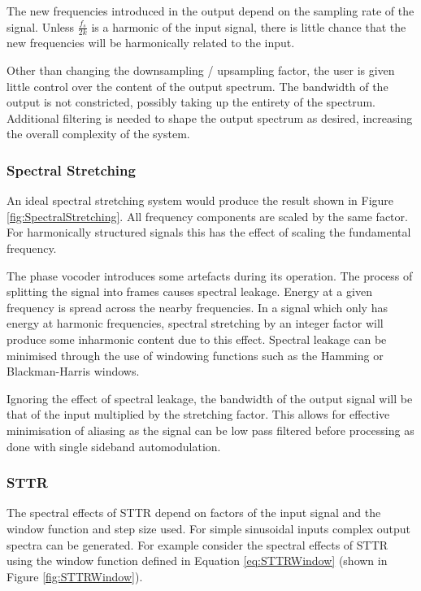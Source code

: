 			The new frequencies introduced in the output depend on the sampling rate of the signal. Unless
			$\frac{f_{s}}{2k}$ is a harmonic of the input signal, there is little chance that the new
			frequencies will be harmonically related to the input.

			Other than changing the downsampling / upsampling factor, the user is given little control over the
			content of the output spectrum. The bandwidth of the output is not constricted, possibly taking up
			the entirety of the spectrum. Additional filtering is needed to shape the output spectrum as
			desired, increasing the overall complexity of the system.

		\subsubsection*{Spectral Stretching}
			An ideal spectral stretching system would produce the result shown in Figure
			\ref{fig:SpectralStretching}. All frequency components are scaled by the same factor. For
			harmonically structured signals this has the effect of scaling the fundamental frequency.

			The phase vocoder introduces some artefacts during its operation. The process of splitting the
			signal into frames causes spectral leakage. Energy at a given frequency is spread across the nearby
			frequencies. In a signal which only has energy at harmonic frequencies, spectral stretching by an
			integer factor will produce some inharmonic content due to this effect. Spectral leakage can be
			minimised through the use of windowing functions such as the Hamming or Blackman-Harris windows. 

			Ignoring the effect of spectral leakage, the bandwidth of the output signal will be that of the
			input multiplied by the stretching factor. This allows for effective minimisation of aliasing as
			the signal can be low pass filtered before processing as done with single sideband automodulation.
		
		\subsubsection*{STTR}
			The spectral effects of STTR depend on factors of the input signal and the window function and
			step size used. For simple sinusoidal inputs complex output spectra can be generated. For example
			consider the spectral effects of STTR using the window function defined in Equation
			\ref{eq:STTRWindow} (shown in Figure \ref{fig:STTRWindow}).

